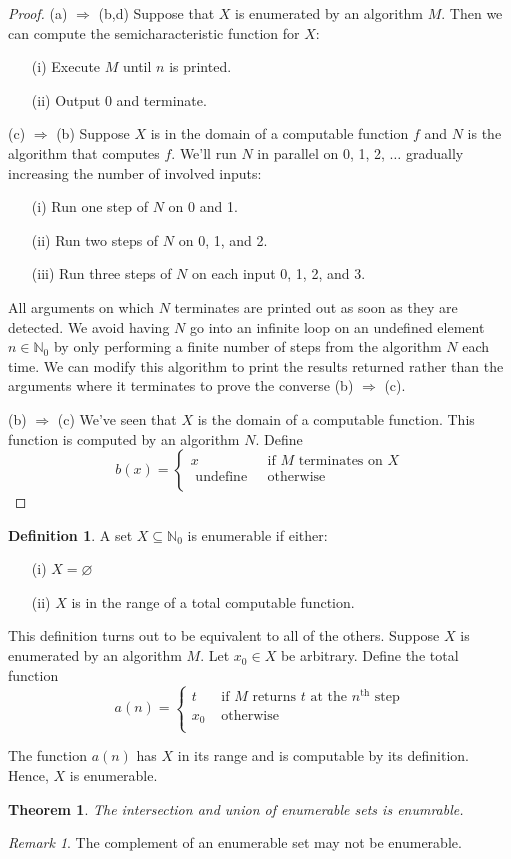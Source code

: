 \documentclass[10pt, letterpaper]{article}
\newcommand{\N}{\mathbb{N}}
\newtheorem{thm}{Theorem}
\theoremstyle{remark}
\newtheorem{rem}{Remark}
\theoremstyle{definition}
\newtheorem{defn}{Definition}
\begin{document}
\begin{proof}
	(a) $\Rightarrow$ (b,d) Suppose that $X$ is enumerated by an algorithm $M$. Then we can compute the semicharacteristic function for $X$:
		\begin{enumerate}
			\item[(i)] Execute $M$ until $n$ is printed.
			\item[(ii)] Output 0 and terminate.
		\end{enumerate}
		
	(c) $\Rightarrow$ (b) Suppose $X$ is in the domain of a computable function $f$ and $N$ is the algorithm that computes $f$. We'll run $N$ in parallel on 0, 1, 2, $\ldots$ gradually increasing the number of involved inputs:
		\begin{enumerate}
			\item[(i)] Run one step of $N$ on 0 and 1.
			\item[(ii)] Run two steps of $N$ on 0, 1, and 2.
			\item[(iii)] Run three steps of $N$ on each input 0, 1, 2, and 3.
		\end{enumerate}
		All arguments on which $N$ terminates are printed out as soon as they are detected. We avoid having $N$ go into an infinite loop on an undefined element $n \in \N_0$ by only performing a finite number of steps from the algorithm $N$ each time. We can modify this algorithm to print the results returned rather than the arguments where it terminates to prove the converse (b) $\Rightarrow$ (c).

(b) $\Rightarrow$ (c) We've seen that $X$ is the domain of a computable function. This function is computed by an algorithm $N$. Define
\[
	b(x) = \begin{cases}
		x &\text{ if } M \text{ terminates on } X \\
		\text{ undefine } & \text{ otherwise } \\
	\end{cases}
\]
\end{proof}

\begin{defn}
	A set $X \subseteq \N_0$ is enumerable if either:
	\begin{enumerate}
		\item[(i)] $X = \varnothing$
		\item[(ii)] $X$ is in the range of a total computable function.
	\end{enumerate}
\end{defn}

This definition turns out to be equivalent to all of the others. Suppose $X$ is enumerated by an algorithm $M$. Let $x_0 \in X$ be arbitrary. Define the total function
\[
	a(n) = \begin{cases}
		t & \text{ if } M \text{ returns $t$ at the $n^{\text{th}}$ step} \\
		x_0 & \text{ otherwise } \\
	\end{cases}
\]

\noindent The function $a(n)$ has $X$ in its range and is computable by its definition. Hence, $X$ is enumerable.

\begin{thm}
	The intersection and union of enumerable sets is enumrable.
\end{thm}

\begin{rem}
	The complement of an enumerable set may not be enumerable.
\end{rem}
\end{document}
